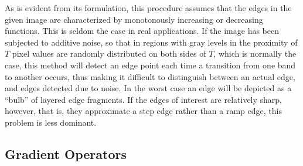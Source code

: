 As is evident from its formulation, this procedure assumes that the
edges in the given image are characterized by monotonously increasing
or decreasing functions.  This is seldom the case in real
applications.  If the image has been subjected to additive noise, so
that in regions with gray levels in the proximity of $T$ pixel values
are randomly distributed on both sides of $T$, which is normally the
case, this method will detect an edge point each time a transition
from one band to another occurs, thus making it difficult to
distinguish between an actual edge, and edges detected due to noise.
In the worst case an edge will be depicted as a ``bulb'' of layered
edge fragments.  If the edges of interest are relatively sharp,
however, that is, they approximate a step edge rather than a ramp
edge, this problem is less dominant.

\subsection{Gradient Operators}
\label{image:edge:gradient}


